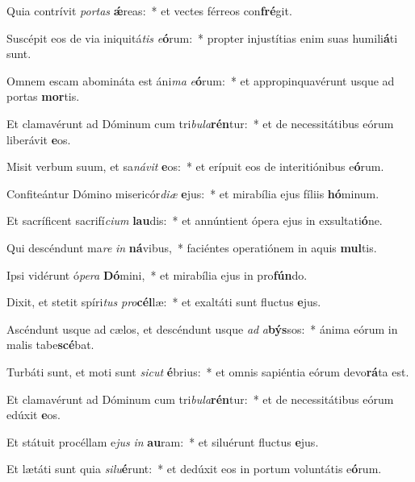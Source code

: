 \item Quia contrívit \textit{por}\textit{tas} \textbf{ǽ}reas:~* et vectes férreos con\textbf{fré}git.
\item Suscépit eos de via iniquitá\textit{tis} \textit{e}\textbf{ó}rum:~* propter injustítias enim suas humili\textbf{á}ti sunt.
\item Omnem escam abomináta est áni\textit{ma} \textit{e}\textbf{ó}rum:~* et appropinquavérunt usque ad portas \textbf{mor}tis.
\item Et clamavérunt ad Dóminum cum tri\textit{bu}\textit{la}\textbf{rén}tur:~* et de necessitátibus eórum liberávit \textbf{e}os.
\item Misit verbum suum, et sa\textit{ná}\textit{vit} \textbf{e}os:~* et erípuit eos de interitiónibus e\textbf{ó}rum.
\item Confiteántur Dómino misericór\textit{di}\textit{æ} \textbf{e}jus:~* et mirabília ejus fíliis \textbf{hó}minum.
\item Et sacríficent sacrifí\textit{ci}\textit{um} \textbf{lau}dis:~* et annúntient ópera ejus in exsultati\textbf{ó}ne.
\item Qui descéndunt ma\textit{re} \textit{in} \textbf{ná}vibus,~* faciéntes operatiónem in aquis \textbf{mul}tis.
\item Ipsi vidérunt ó\textit{pe}\textit{ra} \textbf{Dó}mini,~* et mirabília ejus in pro\textbf{fún}do.
\item Dixit, et stetit spíri\textit{tus} \textit{pro}\textbf{cél}læ:~* et exaltáti sunt fluctus \textbf{e}jus.
\item Ascéndunt usque ad cælos, et descéndunt usque \textit{ad} \textit{a}\textbf{býs}sos:~* ánima eórum in malis tabe\textbf{scé}bat.
\item Turbáti sunt, et moti sunt \textit{sic}\textit{ut} \textbf{é}brius:~* et omnis sapiéntia eórum devo\textbf{rá}ta est.
\item Et clamavérunt ad Dóminum cum tri\textit{bu}\textit{la}\textbf{rén}tur:~* et de necessitátibus eórum edúxit \textbf{e}os.
\item Et státuit procéllam e\textit{jus} \textit{in} \textbf{au}ram:~* et siluérunt fluctus \textbf{e}jus.
\item Et lætáti sunt quia \textit{si}\textit{lu}\textbf{é}runt:~* et dedúxit eos in portum voluntátis e\textbf{ó}rum.
